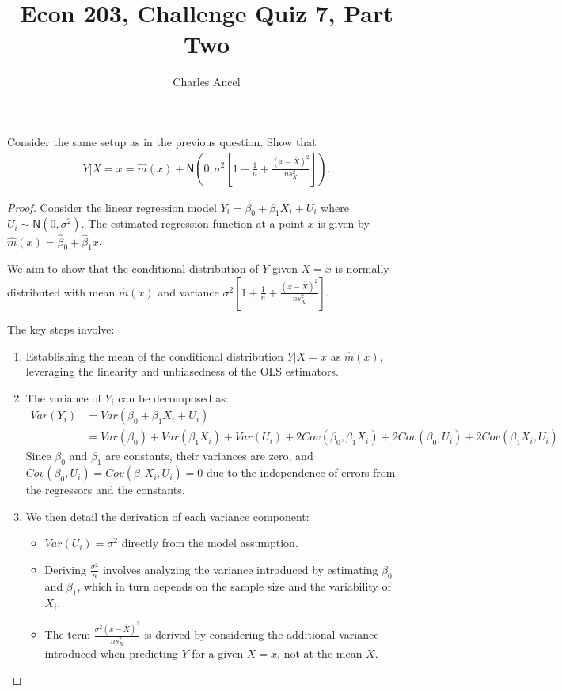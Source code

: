 \documentclass[12pt]{amsart}
\title{Econ 203, Challenge Quiz 7, Part Two}
\author{Charles Ancel}
\theoremstyle{definition}
\numberwithin{equation}{section}
\begin{document}
\maketitle

Consider the same setup as in the previous question. Show that 
\begin{align*}
    Y|X=x=\widehat{m}(x)+\mathsf{N}\left(0,\sigma^2\left[1+\frac{1}{n}+\frac{(x-\bar{X})^2}{ns^2_X}\right]\right).
\end{align*}

\begin{proof}
Consider the linear regression model $Y_i = \beta_0 + \beta_1 X_i + U_i$ where $U_i \sim \mathsf{N}(0, \sigma^2)$. The estimated regression function at a point $x$ is given by $\widehat{m}(x) = \hat{\beta}_0 + \hat{\beta}_1 x$.

We aim to show that the conditional distribution of $Y$ given $X = x$ is normally distributed with mean $\widehat{m}(x)$ and variance $\sigma^2\left[1 + \frac{1}{n} + \frac{(x - \bar{X})^2}{ns^2_X}\right]$.

The key steps involve:

\begin{enumerate}[label=Step \arabic*:]
    \item Establishing the mean of the conditional distribution $Y|X=x$ as $\widehat{m}(x)$, leveraging the linearity and unbiasedness of the OLS estimators.
    
    \item The variance of $Y_i$ can be decomposed as:
    \begin{align*}
        Var(Y_i) &= Var(\beta_0 + \beta_1 X_i + U_i) \\
                 &= Var(\beta_0) + Var(\beta_1 X_i) + Var(U_i) + 2Cov(\beta_0, \beta_1 X_i) + 2Cov(\beta_0, U_i) + 2Cov(\beta_1 X_i, U_i)
    \end{align*}
    Since $\beta_0$ and $\beta_1$ are constants, their variances are zero, and $Cov(\beta_0, U_i) = Cov(\beta_1 X_i, U_i) = 0$ due to the independence of errors from the regressors and the constants.
    
    \item We then detail the derivation of each variance component:
    \begin{itemize}
        \item $Var(U_i) = \sigma^2$ directly from the model assumption.
        \item Deriving $\frac{\sigma^2}{n}$ involves analyzing the variance introduced by estimating $\beta_0$ and $\beta_1$, which in turn depends on the sample size and the variability of $X_i$.
        \item The term $\frac{\sigma^2 (x - \bar{X})^2}{ns^2_X}$ is derived by considering the additional variance introduced when predicting $Y$ for a given $X = x$, not at the mean $\bar{X}$.
    \end{itemize}
    

\end{enumerate}
\end{proof}
\end{document}
